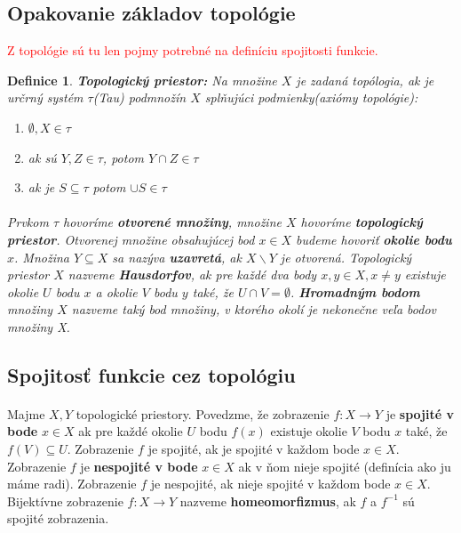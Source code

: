 \documentclass[12pt,a4paper]{article}
\newtheorem{definition}{Definice}
\begin{document}
\subsection{Opakovanie základov topológie}
\textcolor{red}{Z topológie sú tu len pojmy potrebné na definíciu spojitosti funkcie.}
\begin{definition}
	\textbf{Topologický priestor:} Na množine $X$ je zadaná topólogia, ak je určrný systém $\tau$(Tau) podmnožín $X$ splňujúci podmienky(axiómy topológie):
	\begin{enumerate}
		\item $\emptyset, X \in \tau$
		\item ak sú $Y, Z \in \tau$, potom $Y \cap Z \in \tau$
		\item ak je $S \subseteq \tau$ potom $\cup S \in \tau$ 
	\end{enumerate}
	\paragraph{}
	Prvkom $\tau$ hovoríme \textbf{otvorené množiny}, množine $X$ hovoríme \textbf{topologický priestor}. Otvorenej množine obsahujúcej bod $x \in X$ budeme hovoriť \textbf{okolie bodu} $x$. Množina $Y \subseteq X$ sa nazýva \textbf{uzavretá}, ak $X\backslash Y$ je otvorená. Topologický priestor $X$ nazveme \textbf{Hausdorfov}, ak pre každé dva body $x, y \in X, x\neq y$ existuje okolie $U$ bodu $x$ a okolie $V$ bodu $y$ také, že $U\cap V = \emptyset$. \textbf{Hromadným bodom} množiny $X$ nazveme taký bod množiny, v ktorého okolí je nekonečne veľa bodov množiny X.
\end{definition}

\subsection{Spojitosť funkcie cez topológiu}
\paragraph{}
Majme $X, Y$ topologické priestory. Povedzme, že zobrazenie $f:X\rightarrow Y$ je \textbf{spojité v bode} $x\in X$ ak pre každé okolie $U$ bodu $f(x)$ existuje okolie $V$ bodu $x$ také, že $f(V)\subseteq U$. Zobrazenie $f$ je spojité, ak je spojité v každom bode $x \in X$. Zobrazenie $f$ je \textbf{nespojité v bode} $x \in X$ ak v ňom nieje spojité (definícia ako ju máme radi). Zobrazenie $f$ je nespojité, ak nieje spojité v každom bode $x \in X$. Bijektívne zobrazenie $f: X\rightarrow Y$ nazveme \textbf{homeomorfizmus}, ak $f$ a $f^{-1}$ sú spojité zobrazenia.
\end{document}
